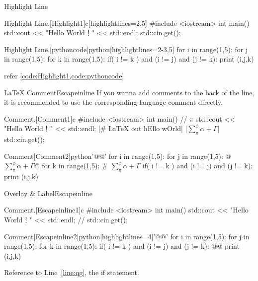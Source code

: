 \documentclass[hyperref, UTF8, CJK]{beamer}
\begin{document}
\begin{frame}[fragile]{Highlight Line}
	\begin{scucode}{Highlight Line.}[Highlight1]{c}[highlightlines={2,5}]
		#include <iostream>
		int main()
		{
			std::cout << "Hello World！" << std::endl;
			std::cin.get();
		}
	\end{scucode}
	\begin{scucode}{Highlight Line.}[pythoncode]{python}[highlightlines={2-3,5}]
		for i in range(1,5):
			for j in range(1,5):
				for k in range(1,5):
					if( i != k ) and (i != j) and (j != k):
						print (i,j,k)
	\end{scucode}
  refer \vref{code:Highlight1,code:pythoncode}
\end{frame}

\begin{frame}[fragile]{\LaTeX{} Comment}{Escapeinline}
	If you wanna add comments to the back of the line, it is recommended to use the corresponding language comment directly.
	\begin{scucode}{Comment.}[Comment1]{c}
		#include <iostream>
		int main()
		{// $\pi$
			std::cout << "Hello World！" << std::endl; |# \textsf{\LaTeX{} out hEllo wOrld}|
			|\colorbox{scugreen!60}{$\sum_\pi^\phi \alpha + \Gamma$}| std::cin.get(); 
		}
	\end{scucode}
	\begin{scucode}{Comment}[Comment2]{python}'@@'
		for i in range(1,5):
			for j in range(1,5): @$\sum_\pi^\phi \alpha + \Gamma$@
				for k in range(1,5): # $\sum_\pi^\phi \alpha + \Gamma$
					if( i != k ) and (i != j) and (j != k):
						print (i,j,k)
	\end{scucode}
\end{frame}

\begin{frame}[fragile]{Overlay \& Label}{Escapeinline}
	\begin{scucode}{Comment.}[Escapeinline1]{c}
		#include <iostream>
		int main()
		{
			std::cout << "Hello World！" << std::endl; // \only<2>{Value 2}
			std::cin.get();
		}
	\end{scucode}
	\begin{scucode}{Comment}[Escapeinline2]{python}[highlightlines={4}]'@@'
		for i in range(1,5):
			for j in range(1,5): 
				for k in range(1,5):
					if( i != k ) and (i != j) and (j != k): @\label{line:qg}@
						print (i,j,k)
	\end{scucode}
  Reference to Line~\ref{line:qg}, the if statement.
\end{frame}
\end{document}
